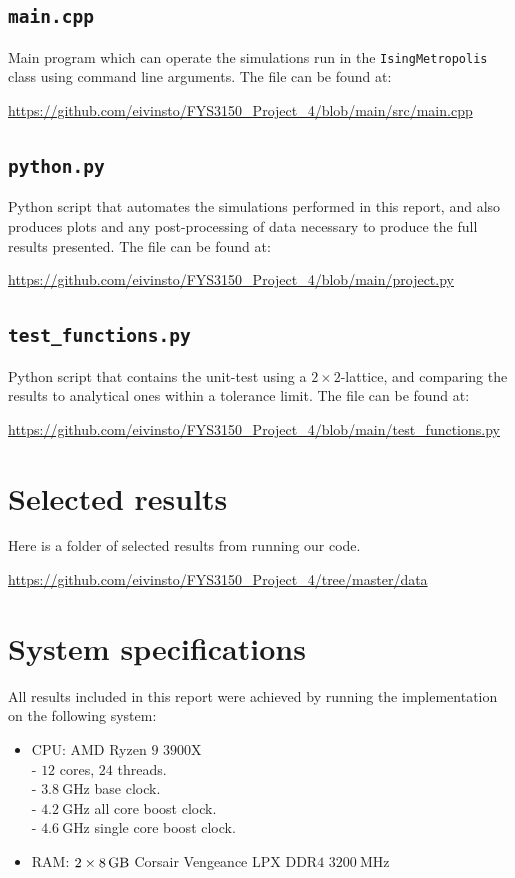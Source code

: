 \documentclass[reprint,english,notitlepage]{revtex4-1}  %
\begin{document}
\cprotect\subsection{\verb+main.cpp+} \label{A.3}

Main program which can operate the simulations run in the \verb+IsingMetropolis+ class using command line arguments. The file can be found at:

\url{https://github.com/eivinsto/FYS3150_Project_4/blob/main/src/main.cpp}

\cprotect\subsection{\verb+python.py+} \label{A.4}

Python script that automates the simulations performed in this report, and also produces plots and any post-processing of data necessary to produce the full results presented. The file can be found at:

\url{https://github.com/eivinsto/FYS3150_Project_4/blob/main/project.py}

\cprotect\subsection{\verb+test_functions.py+} \label{A.5}

Python script that contains the unit-test using a $2 \times 2$-lattice, and comparing the results to analytical ones within a tolerance limit. The file can be found at:

\url{https://github.com/eivinsto/FYS3150_Project_4/blob/main/test_functions.py}


\newpage
\section{Selected results} \label{B}
Here is a folder of selected results from running our code.

\url{https://github.com/eivinsto/FYS3150_Project_4/tree/master/data}

\newpage
\section{System specifications} \label{C}
All results included in this report were achieved by running the implementation on the following system:

\begin{itemize}
	\item CPU: AMD Ryzen \(9\) \(3900\)X \\
		- \(12\) cores, \(24\) threads. \\ 
		- \(\SI{3.8}{\giga\hertz}\) base clock. \\
		- \(\SI{4.2}{\giga\hertz}\) all core boost clock. \\
		- \(\SI{4.6}{\giga\hertz}\) single core boost clock. \\
	\item RAM: \(2\times\SI{8}{\giga\byte}\) Corsair Vengeance LPX DDR\(4\) \(\SI{3200}{\mega\hertz}\)
\end{itemize}
\end{document}
